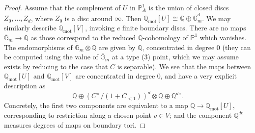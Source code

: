 \documentclass[11pt]{amsart}
\numberwithin{equation}{section}
\numberwithin{theorem}{section}
\theoremstyle{definition}
\begin{document}
\begin{proof} Assume that the complement of $U$ in $\mathbb P^1_A$ is the union of closed discs $Z_0,\ldots,Z_d$, where $Z_0$ is a disc around $\infty$. Then $\mathbb Q_{\mathrm{mot}}[U]\cong \mathbb Q\oplus \overline{\mathbb G}_m^d$. We may similarly describe $\mathbb Q_{\mathrm{mot}}[V]$, invoking $e$ finite boundary discs. There are no maps $\overline{\mathbb G}_m\to \mathbb Q$ as those correspond to the reduced $\mathbb Q$-cohomology of $\mathbb P^1$ which vanishes. The endomorphisms of $\overline{\mathbb G}_m\otimes \mathbb Q$ are given by $\mathbb Q$, concentrated in degree $0$ (they can be computed using the value of $\overline{\mathbb G}_m$ at a type (3) point, which we may assume exists by reducing to the case that $C$ is separable). We see that the maps between $\mathbb Q_{\mathrm{mot}}[U]$ and $\mathbb Q_{\mathrm{mot}}[V]$ are concentrated in degree $0$, and have a very explicit description as
\[
\mathbb Q\oplus (C^\times/(1+C_{<1}))^d\otimes \mathbb Q\oplus \mathbb Q^{de}.
\]
Concretely, the first two components are equivalent to a map $\mathbb Q\to \mathbb Q_{\mathrm{mot}}[U]$, corresponding to restriction along a chosen point $v\in V$; and the component $\mathbb Q^{de}$ measures degrees of maps on boundary tori.


\end{proof}
\end{document}
